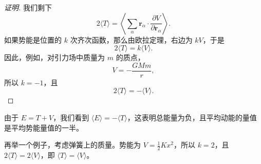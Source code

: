 \begin{proof}[证明]
我们剩下
\begin{equation}\label{eq:1.vir8}
2\langle T\rangle = \left\langle\sum_{\alpha}\mathbf{r}_\alpha\cdot\frac{\partial V}{\partial \mathbf{r}_\alpha}\right\rangle.
\end{equation}
如果势能是位置的 $k$ 次齐次函数，那么由欧拉定理，右边为 $kV$，于是
\begin{equation}\label{eq:1.virial}
2\langle T\rangle = k\langle V\rangle.
\end{equation}
因此，例如，对引力场中质量为 $m$ 的质点，
\begin{equation}\label{eq:1.grav}
V = -\frac{GMm}{r},
\end{equation}
所以 $k = -1$，且
\begin{equation}\label{eq:1.virial.g}
2\langle T\rangle = -\langle V\rangle.
\end{equation}
\end{proof}
由于 $E = T + V$，我们看到 $\langle E\rangle = -\langle T\rangle$，这表明总能量为负，且平均动能的量值是平均势能量值的一半。

再举一个例子，考虑弹簧上的质量。势能为 $V = \frac{1}{2}Kx^2$，所以 $k = 2$，且 $2\langle T\rangle = 2\langle V\rangle$，即 $\langle T\rangle = \langle V\rangle$。
